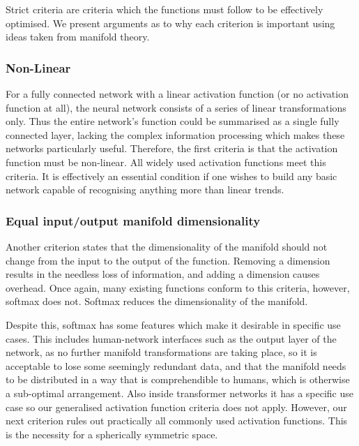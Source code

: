 \documentclass[onecolumn]{article}
\begin{document}
    Strict criteria are criteria which the functions must follow to be effectively optimised. We present arguments as to why each criterion is important using ideas taken from manifold theory.
   
    \subsubsection{Non-Linear}
        
    For a fully connected network with a linear activation function (or no activation function at all), the neural network consists of a series of linear transformations only. Thus the entire network's function could be summarised as a single fully connected layer, lacking the complex information processing which makes these networks particularly useful. Therefore, the first criteria is that the activation function must be non-linear. All widely used activation functions meet this criteria. It is effectively an essential condition if one wishes to build any basic network capable of recognising anything more than linear trends.
    
        
    \subsubsection{Equal input/output manifold dimensionality}
       
    Another criterion states that the dimensionality of the manifold should not change from the input to the output of the function. Removing a dimension results in the needless loss of information, and adding a dimension causes overhead. Once again, many existing functions conform to this criteria, however, softmax does not. Softmax reduces the dimensionality of the manifold.
    
    Despite this, softmax has some features which make it desirable in specific use cases. This includes human-network interfaces such as the output layer of the network, as no further manifold transformations are taking place, so it is acceptable to lose some seemingly redundant data, and that the manifold needs to be distributed in a way that is comprehendible to humans, which is otherwise a sub-optimal arrangement. Also inside transformer networks it has a specific use case so our generalised activation function criteria does not apply. However, our next criterion rules out practically all commonly used activation functions. This is the necessity for a spherically symmetric space.
    
\end{document}
